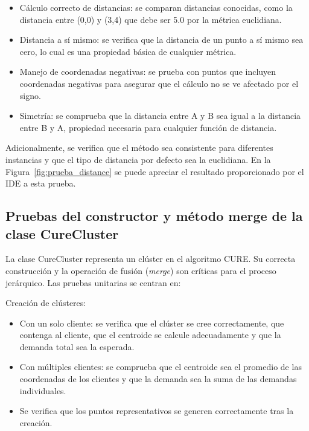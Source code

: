\begin{itemize}
  \item C\'alculo correcto de distancias: se comparan distancias conocidas, como la distancia entre (0,0) y (3,4) que debe ser 5.0 por la m\'etrica euclidiana.
  \item Distancia a s\'i mismo: se verifica que la distancia de un punto a s\'i mismo sea cero, lo cual es una propiedad b\'asica de cualquier m\'etrica.
  \item Manejo de coordenadas negativas: se prueba con puntos que incluyen coordenadas negativas para asegurar que el c\'alculo no se ve afectado por el signo.
  \item Simetr\'ia: se comprueba que la distancia entre A y B sea igual a la distancia entre B y A, propiedad necesaria para cualquier funci\'on de distancia.
\end{itemize}

Adicionalmente, se verifica que el m\'etodo sea consistente para diferentes instancias y que el tipo de distancia por defecto sea la euclidiana. En la Figura~\ref{fig:prueba_distance} se puede apreciar el resultado proporcionado por el IDE a esta prueba.


\subsection{Pruebas del constructor y m\'etodo merge de la clase CureCluster}

La clase CureCluster representa un cl\'uster en el algoritmo CURE. Su correcta construcci\'on y la operaci\'on de fusi\'on (\textit{merge}) son cr\'iticas para el proceso jer\'arquico. Las pruebas unitarias se centran en:

Creaci\'on de cl\'usteres:

\begin{itemize}
  \item Con un solo cliente: se verifica que el cl\'uster se cree correctamente, que contenga al cliente, que el centroide se calcule adecuadamente y que la demanda total sea la esperada.
  \item Con m\'ultiples clientes: se comprueba que el centroide sea el promedio de las coordenadas de los clientes y que la demanda sea la suma de las demandas individuales.
  \item Se verifica que los puntos representativos se generen correctamente tras la creaci\'on.
\end{itemize}

